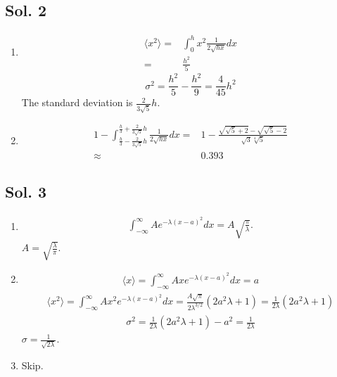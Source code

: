 \subsection*{Sol. 2}
\begin{enumerate}
    \item 
    \begin{align*}
        \langle x^2\rangle = &
        \int_0^h x^2 \frac{1}{2\sqrt{hx}}dx\\
        =&\frac{h^2}{5}
    \end{align*}
    $$
    \sigma^2 = \frac{h^2}{5} - \frac{h^2}{9} = \frac{4}{45}h^2
    $$
    The standard deviation is $\frac{2}{3\sqrt{5}}h$.
    \item 
    \begin{align*}
        1 - 
        \int_{\frac{h}{3}-\frac{2}{3\sqrt{5}}h}
        ^{\frac{h}{3}+\frac{2}{3\sqrt{5}}h}
        \frac{1}{2\sqrt{hx}}dx = &
        1-\frac{\sqrt{\sqrt{5} + 2} - \sqrt{\sqrt{5} - 2}}{\sqrt{3} \sqrt[4]{5}}\\
        \approx & 0.393
    \end{align*}
\end{enumerate}

\subsection*{Sol. 3}
\begin{enumerate}
    \item 
    \begin{align*}
        \int_{-\infty}^{\infty}
        Ae^{-\lambda(x-a)^2}dx = A\sqrt{\frac{\pi}{\lambda}}.
    \end{align*}
    $A= \sqrt{\frac{\lambda}{\pi}}$.
    \item 
    \begin{align*}
        \langle x\rangle = \int_{-\infty}^{\infty}
        Axe^{-\lambda(x-a)^2}dx = a
    \end{align*}
    \begin{align*}
        \langle x^2\rangle = \int_{-\infty}^{\infty}
        Ax^2e^{-\lambda(x-a)^2}dx = \frac{A\sqrt{\pi}}{2\lambda^{3/2}}(2a^2\lambda+1)=\frac{1}{2\lambda}(2a^2\lambda+1)
    \end{align*}
    \begin{align*}
        \sigma^2 = \frac{1}{2\lambda}(2a^2\lambda+1) - a^2 = \frac{1}{2\lambda}
    \end{align*}
    $\sigma = \frac{1}{\sqrt{2\lambda}}$.
    \item Skip.
\end{enumerate}

